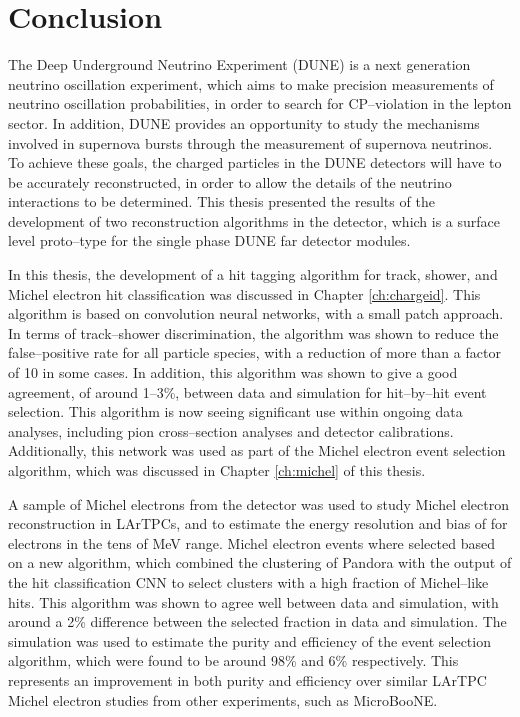 \chapter{\label{ch:conclusion}Conclusion} 


\minitoc

The Deep Underground Neutrino Experiment (DUNE) is a next generation neutrino
oscillation experiment, which aims to make precision measurements of neutrino
oscillation probabilities, in order to search for CP--violation in the lepton
sector. In addition, DUNE provides an opportunity to study the mechanisms
involved in supernova bursts through the measurement of supernova neutrinos. 
To achieve these goals, the charged particles in the DUNE detectors will have to
be accurately reconstructed, in order to allow the details of the neutrino
interactions to be determined. This thesis presented the results of the
development of two reconstruction algorithms in the \protodune{} detector, which
is a surface level proto--type for the single phase DUNE far detector modules. 

In this thesis, the development of a hit tagging algorithm for track, shower, 
and Michel electron hit classification was discussed in Chapter 
\ref{ch:chargeid}. This algorithm is based on convolution neural networks, 
with a small patch approach. In terms of track--shower discrimination, the 
algorithm was shown to reduce the false--positive rate for all particle 
species, with a reduction of more than a factor of 10 in some cases. In 
addition, this algorithm was shown to give a good agreement, of around 
1--3\%, between data and simulation for hit--by--hit event selection. This 
algorithm is now seeing significant use within ongoing \protodune{} data 
analyses, including pion cross--section analyses and detector calibrations. 
Additionally, this network was used as part of the Michel electron event 
selection algorithm, which was discussed in Chapter \ref{ch:michel} of this 
thesis.

A sample of Michel electrons from the \protodune{} detector was used to study
Michel electron reconstruction in LArTPCs, and to estimate the energy resolution
and bias of \protodune{} for electrons in the tens of MeV range. Michel electron
events where selected based on a new algorithm, which combined the clustering of
Pandora with the output of the hit classification CNN to select clusters with a
high fraction of Michel--like hits. This algorithm was shown to agree well
between data and simulation, with around a 2\% difference between the selected
fraction in data and simulation. The simulation was used to estimate the purity
and efficiency of the event selection algorithm, which were found to be around
98\% and 6\% respectively. This represents an improvement in both purity and
efficiency over similar LArTPC Michel electron studies from other experiments,
such as MicroBooNE.

